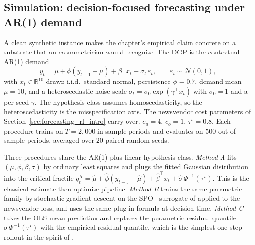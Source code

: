 \subsection{Simulation: decision-focused forecasting under AR(1) demand}
\label{sec:forecasting_rl_sim}

A clean synthetic instance makes the chapter's empirical claim concrete on
a substrate that an econometrician would recognise. The DGP is the
contextual AR(1) demand
\begin{equation}
y_t = \mu + \phi (y_{t-1} - \mu) + \beta^\top x_t + \sigma_t\,
\varepsilon_t, \qquad \varepsilon_t \sim \mathcal N(0, 1),
\label{eq:ar1_dgp}
\end{equation}
with $x_t \in \mathbb R^{10}$ drawn i.i.d.\ standard normal, persistence
$\phi = 0.7$, demand mean $\mu = 10$, and a heteroscedastic noise scale
$\sigma_t = \sigma_0 \exp(\gamma^\top x_t)$ with $\sigma_0 = 1$ and a
per-seed $\gamma$. The hypothesis class assumes homoscedasticity, so the
heteroscedasticity is the misspecification axis. The newsvendor cost
parameters of Section~\ref{sec:forecasting_rl_intro} carry over.
$c_u = 4$, $c_o = 1$, $\tau^\star = 0.8$. Each procedure trains on
$T = 2{,}000$ in-sample periods and evaluates on $500$ out-of-sample
periods, averaged over $20$ paired random seeds.

Three procedures share the AR(1)-plus-linear hypothesis class.
\emph{Method A} fits $(\mu, \phi, \beta, \sigma)$ by ordinary least
squares and plugs the fitted Gaussian distribution into the critical
fractile $q^{\mathrm A}_t = \hat\mu + \hat\phi (y_{t-1} - \hat\mu) +
\hat\beta^\top x_t + \hat\sigma\, \Phi^{-1}(\tau^\star)$. This is the
classical estimate-then-optimise pipeline. \emph{Method B} trains the
same parametric family by stochastic gradient descent on the SPO$^+$
surrogate of \citet{ElmachtoubGrigas2022} applied to the newsvendor loss,
and uses the same plug-in formula at decision time. \emph{Method C} takes
the OLS mean prediction and replaces the parametric residual quantile
$\hat\sigma\, \Phi^{-1}(\tau^\star)$ with the empirical residual quantile,
which is the simplest one-step rollout in the spirit of
\citet{BertsekasRollout2022}.

\begin{table}[h]
\centering
\caption{Decision-focused forecasting under AR(1) demand with
heteroscedastic noise, $20$ seeds, standard errors in parentheses.
Method B attains the same in-sample MSE as Method A but a factor-of-five
lower realised newsvendor regret.}
\label{tab:forecasting_rl_sim}

\end{table}

